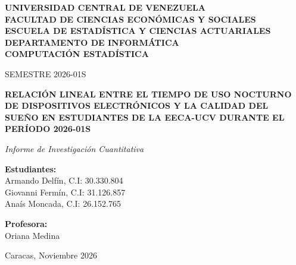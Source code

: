 \documentclass[12pt, letterpaper]{article}
\begin{document}
\hypersetup{pageanchor=false}
\begin{titlepage}
    \centering
    {\bfseries UNIVERSIDAD CENTRAL DE VENEZUELA\\
    FACULTAD DE CIENCIAS ECONÓMICAS Y SOCIALES\\
    ESCUELA DE ESTADÍSTICA Y CIENCIAS ACTUARIALES\\
    DEPARTAMENTO DE INFORMÁTICA\\
    COMPUTACIÓN ESTADÍSTICA\par}
    \vspace{0.3cm}
    {\small SEMESTRE 2026-01S\par}

    \vspace{2.8cm}
    {\bfseries\large RELACIÓN LINEAL ENTRE EL TIEMPO DE USO NOCTURNO DE DISPOSITIVOS ELECTRÓNICOS Y LA CALIDAD DEL SUEÑO EN ESTUDIANTES DE LA EECA-UCV DURANTE EL PERÍODO 2026-01S\par}
    \vspace{0.5cm}
    {\itshape Informe de Investigación Cuantitativa\par}

    \vspace{3.2cm}
    \noindent
    \begin{minipage}[t]{0.55\textwidth}
        \raggedright
        \textbf{Estudiantes:}\\[0.15cm]
        Armando Delfín, C.I: 30.330.804\\
        Giovanni Fermín, C.I: 31.126.857\\
        Anaís Moncada, C.I: 26.152.765
    \end{minipage}%
    \hfill
    \begin{minipage}[t]{0.38\textwidth}
        \textbf{Profesora:}\\[0.15cm]
        Oriana Medina
    \end{minipage}

    \vfill
    {\normalsize Caracas, Noviembre 2026\par}
\end{titlepage}
\hypersetup{pageanchor=true}

\begin{singlespace}
\tableofcontents
\newpage
\listoftables
\listoffigures
\end{singlespace}
\newpage
\end{document}

